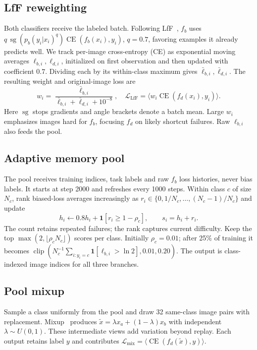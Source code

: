 \documentclass[10pt,twocolumn,letterpaper]{article}
\newcommand{\CE}{\operatorname{CE}}
\begin{document}
\subsection{LfF reweighting}
Both classifiers receive the labeled batch. Following LfF~\cite{nam2020lff}, $f_b$ uses $q\,\operatorname{sg}(p_b(y_i|x_i)^q)\CE(f_b(x_i),y_i)$, $q=0.7$, favoring examples it already predicts well. We track per-image cross-entropy (CE) as exponential moving averages $\ell_{b,i},\ell_{d,i}$, initialized on first observation and then updated with coefficient $0.7$. Dividing each by its within-class maximum gives $\bar\ell_{b,i},\bar\ell_{d,i}$. The resulting weight and original-image loss are
\begin{equation}
 w_i=\frac{\bar\ell_{b,i}}{\bar\ell_{b,i}+\bar\ell_{d,i}+10^{-8}},\quad
 \mathcal L_{\mathrm{LfF}}=\langle w_i\CE(f_d(x_i),y_i)\rangle.
\end{equation}
Here $\operatorname{sg}$ stops gradients and angle brackets denote a batch mean. Large $w_i$ emphasizes images hard for $f_b$, focusing $f_d$ on likely shortcut failures. Raw $\ell_{b,i}$ also feeds the pool.

\subsection{Adaptive memory pool}
The pool receives training indices, task labels and raw $f_b$ loss histories, never bias labels. It starts at step 2000 and refreshes every 1000 steps. Within class $c$ of size $N_c$, rank biased-loss averages increasingly as $r_i\in\{0,1/N_c,\ldots,(N_c-1)/N_c\}$ and update
\begin{equation}
 h_i\leftarrow0.8h_i+\mathbf1[r_i\ge1-\rho_c],\qquad s_i=h_i+r_i.
\end{equation}
The count retains repeated failures; the rank captures current difficulty. Keep the top $\max(2,\lfloor\rho_cN_c\rfloor)$ scores per class. Initially $\rho_c=0.01$; after 25\% of training it becomes $\operatorname{clip}(N_c^{-1}\sum_{i:y_i=c}\mathbf1[\ell_{b,i}>\ln2],0.01,0.20)$. The output is class-indexed image indices for all three branches.

\subsection{Pool mixup}
Sample a class uniformly from the pool and draw 32 same-class image pairs with replacement. Mixup~\cite{zhang2018mixup} produces $\tilde x=\lambda x_a+(1-\lambda)x_b$ with independent $\lambda\sim U(0,1)$. These intermediate views add variation beyond replay. Each output retains label $y$ and contributes $\mathcal L_{\mathrm{mix}}=\langle\CE(f_d(\tilde x),y)\rangle$.
\end{document}
